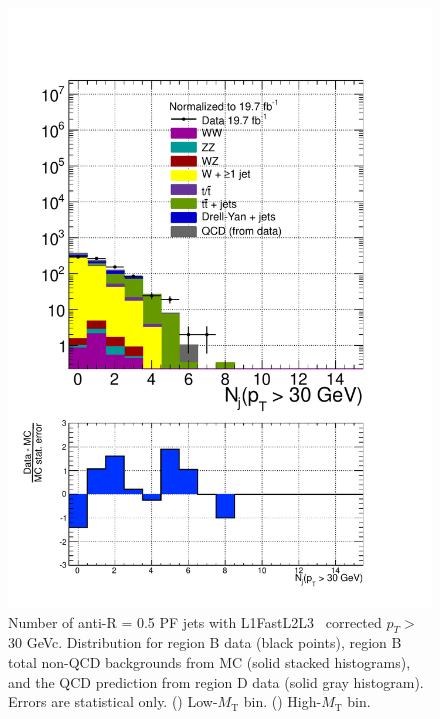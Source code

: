 \begin{figure}[hbtp]
\begin{center}
    \includegraphics[width=\cmsFigWidth]{figures/dataVsMCQCD_nAddlJetsPTGeq30_highMT_v87}
    \caption{Number of anti-\kt R = 0.5 PF jets with L1FastL2L3~\cite{1748-0221-6-11-P11002} corrected $p_T >$ 30 GeVc. Distribution for region B data (black points), region B total non-QCD backgrounds from MC (solid stacked histograms), and the QCD prediction from region D data (solid gray histogram).  Errors are statistical only. (\cmsLeft) Low-$M_{\text{T}}$ bin. (\cmsRight) High-$M_{\text{T}}$ bin.}
    \label{fig:regB-data-MC-nAddlJetsPTGeq20}
  \end{center}
\end{figure}

